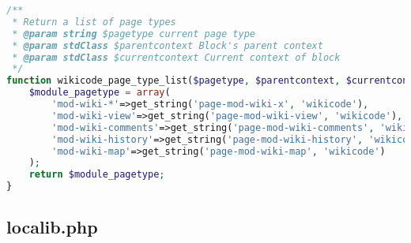 \begin{lstlisting}[language=PHP]
/**
 * Return a list of page types
 * @param string $pagetype current page type
 * @param stdClass $parentcontext Block's parent context
 * @param stdClass $currentcontext Current context of block
 */
function wikicode_page_type_list($pagetype, $parentcontext, $currentcontext) {
    $module_pagetype = array(
        'mod-wiki-*'=>get_string('page-mod-wiki-x', 'wikicode'),
        'mod-wiki-view'=>get_string('page-mod-wiki-view', 'wikicode'),
        'mod-wiki-comments'=>get_string('page-mod-wiki-comments', 'wikicode'),
        'mod-wiki-history'=>get_string('page-mod-wiki-history', 'wikicode'),
        'mod-wiki-map'=>get_string('page-mod-wiki-map', 'wikicode')
    );
    return $module_pagetype;
}
\end{lstlisting}

\subsection{localib.php}
